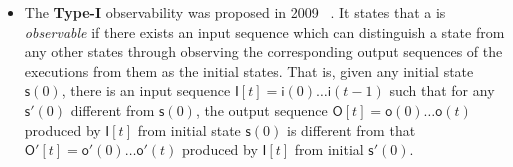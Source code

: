 \begin{itemize}
\item The  {\bf Type-I}  observability was proposed in 2009 ~\cite{cheng2009controllability}. It states that a {\BCN} is {\em observable} if there exists an input sequence  which can distinguish a state  from any other  states through observing the corresponding output sequences of the executions from them  as the initial states. That is,  given any initial state $\mathsf{s}(0)$, there is an input sequence $\mathsf{I}[t]=\mathsf{i}(0)\ldots\mathsf{i}(t-1)$  such that  for any  $\mathsf{s}'(0)$ different from $\mathsf{s}(0)$, the output sequence  $\mathsf{O}[t]=\mathsf{o}(0)\ldots\mathsf{o}(t)$ produced by  $\mathsf{I}[t]$ from initial state $\mathsf{s}(0)$ is different from that   $\mathsf{O}'[t]=\mathsf{o}'(0)\ldots \mathsf{o}'(t)$ produced by $\mathsf{I}[t]$ from initial $\mathsf{s}'(0)$.

	

\end{itemize}
